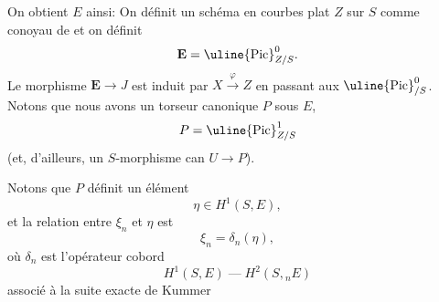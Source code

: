 On obtient $E$ ainsi:  On définit un schéma en courbes plat $Z$ sur $S$ comme conoyau de
et on définit
\[
\mathbf E=\uline{\mathrm{Pic}}^0_{Z/S}.
\]
 Le morphisme $\mathbf E\longrightarrow J$ est induit par $X\xrightarrow{\varphi}Z$ en passant aux $\uline{\mathrm{Pic}}^0_{/S}$. Notons que nous avons un torseur canonique $P$ sous $E$,
\[
P=\uline{\mathrm{Pic}}^1_{Z/S}
\]
(et, d'ailleurs, un $S$-morphisme can $U\longrightarrow P$).

Notons que $P$ définit un élément
\[
\boxed{\eta\in H^1(S,E)},
\]
et la relation entre $\xi_n$ et $\eta$ est
\[
\boxed{\xi_n=\delta_n(\eta)},
\]
où $\delta_n$ est l'opérateur cobord
\[
H^1(S,E)\mathbin{\text{---}}H^2(S,{}_n E)
\]
associé à la suite exacte de Kummer

